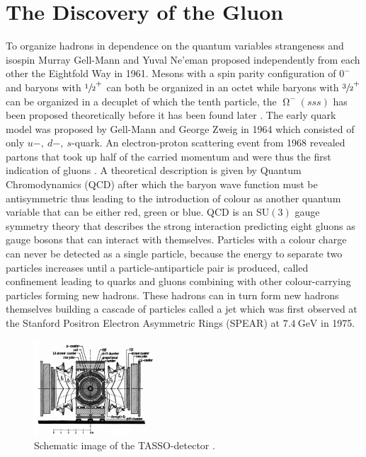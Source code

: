 \chapter{The Discovery of the Gluon}

To organize hadrons in dependence on the quantum variables strangeness and isospin Murray Gell-Mann and Yuval Ne'eman proposed independently from each other the Eightfold Way in 1961.
Mesons with a spin parity configuration of $0^-$ and baryons with $\sfrac 12^+$ can both be organized in an octet while baryons with $\sfrac 32^+$ can be organized in a decuplet of which the tenth particle, the $\upOmega^-(sss)$ has been proposed theoretically before it has been found later \cite{Fritzsch2018}.
The early quark model was proposed by Gell-Mann and George Zweig in 1964 which consisted of only $u-,\ d-,\ s$-quark.
An electron-proton scattering event from 1968 revealed partons that took up half of the carried momentum and were thus the first indication of gluons \cite{Venker}.
A theoretical description is given by Quantum Chromodynamics (QCD) after which the baryon wave function must be antisymmetric thus leading to the introduction of colour as another quantum variable that can be either red, green or blue.
QCD is an $\text{SU}(3)$ gauge symmetry theory that describes the strong interaction predicting eight gluons as gauge bosons that can interact with themselves.
Particles with a colour charge can never be detected as a single particle, because the energy to separate two particles increases until a particle-antiparticle pair is produced, called confinement leading to quarks and gluons combining with other colour-carrying particles forming new hadrons.
These hadrons can in turn form new hadrons themselves building a cascade of particles called a jet which was first observed at the Stanford Positron Electron Asymmetric Rings (SPEAR) at $\SI{7.4}{\giga\eV}$ in 1975.
\begin{figure}
    \centering
    \includegraphics[width=0.4\textwidth]{figs/TASSO.png}
    \caption{Schematic image of the TASSO-detector \cite{TASSO:1979xej}.}
    \label{fig:TASSO}
\end{figure}
